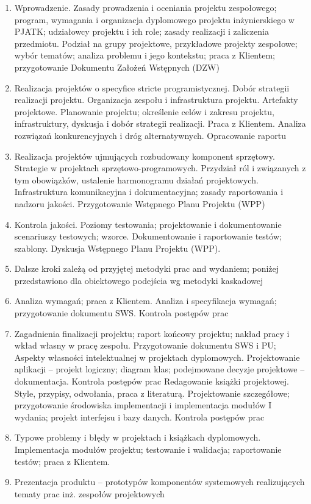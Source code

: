 \documentclass[12pt, a4paper]{article}
\begin{document}
\begin{enumerate}
  \item Wprowadzenie. Zasady prowadzenia i oceniania projektu zespołowego; program, wymagania i organizacja dyplomowego projektu inżynierskiego w PJATK; udziałowcy projektu i ich role; zasady realizacji i zaliczenia przedmiotu. Podział na grupy projektowe, przykładowe projekty zespołowe; wybór tematów; analiza problemu i jego kontekstu; praca z Klientem; przygotowanie Dokumentu Założeń Wstępnych (DZW)
  \item Realizacja projektów o specyfice stricte programistycznej. Dobór strategii realizacji projektu. Organizacja zespołu i infrastruktura projektu. Artefakty projektowe. Planowanie projektu; określenie celów i zakresu projektu, infrastruktury, dyskusja i dobór strategii realizacji. Praca z Klientem. Analiza rozwiązań konkurencyjnych i dróg alternatywnych. Opracowanie raportu
  \item Realizacja projektów ujmujących rozbudowany komponent sprzętowy. Strategie w projektach sprzętowo-programowych. Przydział ról i związanych z tym obowiązków, ustalenie harmonogramu działań projektowych. Infrastruktura komunikacyjna i dokumentacyjna; zasady raportowania i nadzoru jakości. Przygotowanie Wstępnego Planu Projektu (WPP)
  \item Kontrola jakości. Poziomy testowania; projektowanie i dokumentowanie scenariuszy testowych; wzorce. Dokumentowanie i raportowanie testów; szablony. Dyskusja Wstępnego Planu Projektu (WPP).
  \item Dalsze kroki zależą od przyjętej metodyki prac and wydaniem; poniżej przedstawiono dla obiektowego podejścia wg metodyki kaskadowej
  \item Analiza wymagań; praca z Klientem. Analiza i specyfikacja wymagań; przygotowanie dokumentu SWS. Kontrola postępów prac
  \item Zagadnienia finalizacji projektu; raport końcowy projektu; nakład pracy i wkład własny w pracę zespołu. Przygotowanie dokumentu SWS i PU; Aspekty własności intelektualnej w projektach dyplomowych. Projektowanie aplikacji – projekt logiczny; diagram klas; podejmowane decyzje projektowe – dokumentacja. Kontrola postępów prac Redagowanie książki projektowej. Style, przypisy, odwołania, praca z literaturą. Projektowanie szczegółowe; przygotowanie środowiska implementacji i implementacja modułów I wydania; projekt interfejsu i bazy danych. Kontrola postępów prac
  \item Typowe problemy i błędy w projektach i książkach dyplomowych. Implementacja modułów projektu; testowanie i walidacja; raportowanie testów; praca z Klientem.
  \item Prezentacja produktu – prototypów komponentów systemowych realizujących tematy prac inż. zespołów projektowych
\end{enumerate}
\end{document}
